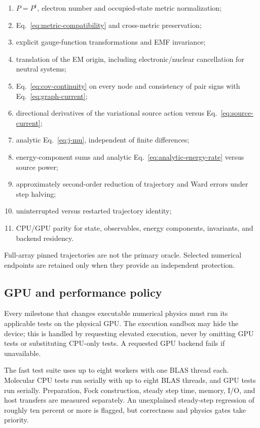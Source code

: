 \documentclass[11pt]{article}
\begin{document}
\begin{enumerate}
\item \(P=P^\dagger\), electron number and occupied-state metric
  normalization;
\item Eq.~\eqref{eq:metric-compatibility} and cross-metric preservation;
\item explicit gauge-function transformations and EMF invariance;
\item translation of the EM origin, including electronic/nuclear
  cancellation for neutral systems;
\item Eq.~\eqref{eq:cov-continuity} on every node and consistency of pair
  signs with Eq.~\eqref{eq:graph-current};
\item directional derivatives of the variational source action versus
  Eq.~\eqref{eq:source-current};
\item analytic Eq.~\eqref{eq:j-mu}, independent of finite differences;
\item energy-component sums and analytic Eq.~\eqref{eq:analytic-energy-rate}
  versus source power;
\item approximately second-order reduction of trajectory and Ward errors
  under step halving;
\item uninterrupted versus restarted trajectory identity;
\item CPU/GPU parity for state, observables, energy components, invariants,
  and backend residency.
\end{enumerate}

Full-array pinned trajectories are not the primary oracle. Selected numerical
endpoints are retained only when they provide an independent protection.

\subsection{GPU and performance policy}

Every milestone that changes executable numerical physics must run its
applicable tests on the physical GPU. The execution sandbox may hide the
device; this is handled by requesting elevated execution, never by omitting
GPU tests or substituting CPU-only tests. A requested GPU backend fails if
unavailable.

The fast test suite uses up to eight workers with one BLAS thread each.
Molecular CPU tests run serially with up to eight BLAS threads, and GPU tests
run serially. Preparation, Fock construction, steady step time, memory, I/O,
and host transfers are measured separately. An unexplained steady-step
regression of roughly ten percent or more is flagged, but correctness and
physics gates take priority.
\end{document}
